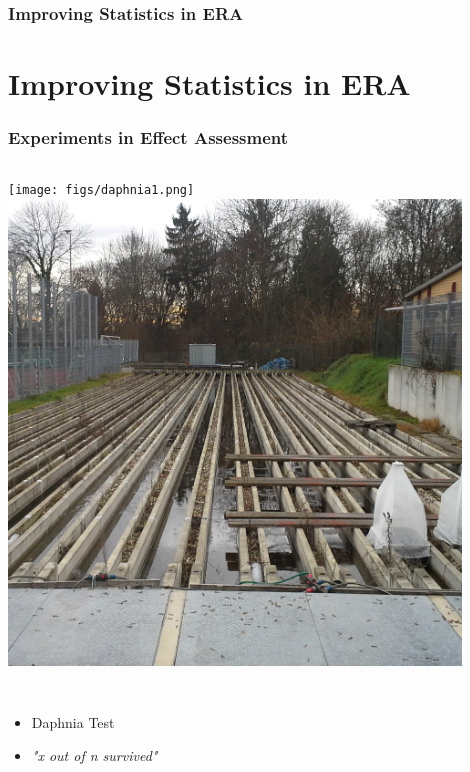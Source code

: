 \documentclass[
	12pt
	]{beamer}
\begin{document}
\begin{frame}[noframenumbering]
\frametitle{Improving Statistics in ERA}
    \vspace*{5mm}
	\resizebox{1.1\textwidth}{!}{
		\hspace*{-20mm}
	}
\end{frame}
\endgroup


\section{Improving Statistics in ERA}

{%
\begin{frame}
\frametitle{Experiments in Effect Assessment}
	\begin{columns}[T]
		\texttt{[image: figs/daphnia1.png]}
	\column<2->{.49\textwidth}
		\includegraphics[width=0.9\textwidth]{figs/mesocosm_ld.jpg}
	\end{columns}

	\vfill
	\begin{columns}[T]
		\begin{itemize}
			\item Daphnia Test
			\item \emph{"x out of n survived"}
		\end{itemize}


\end{columns}
\end{frame}}
\end{document}

